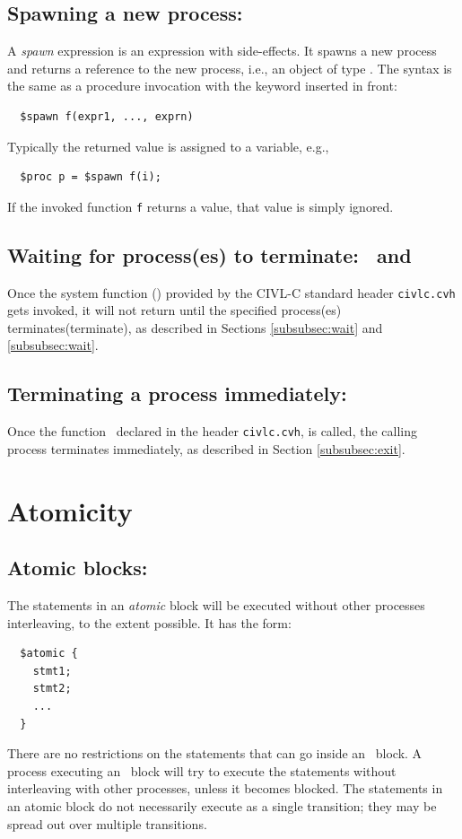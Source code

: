 \subsection{Spawning a new process: \cspawn}

A \emph{spawn} expression is an expression with side-effects.  It
spawns a new process and returns a reference to the new process, i.e.,
an object of type \cproc.  The syntax is the same as a procedure
invocation with the keyword \cspawn{} inserted in front:
\begin{verbatim}
  $spawn f(expr1, ..., exprn)
\end{verbatim}
Typically the returned value is assigned to a variable, e.g.,
\begin{verbatim}
  $proc p = $spawn f(i);
\end{verbatim}
If the invoked function \texttt{f} returns a value, that value is
simply ignored.

\subsection{Waiting for process(es) to terminate: \cwait\ and \cwaitall}

Once the system function \cwait(\cwaitall) provided by the CIVL-C standard header \texttt{civlc.cvh} 
gets invoked, it will not return until the specified process(es) terminates(terminate), as described in Sections \ref{subsubsec:wait} and
\ref{subsubsec:wait}.

\subsection{Terminating a process immediately: \cexit}
Once the function \cexit\, declared in the header \texttt{civlc.cvh}, is called, the calling process terminates immediately, as described in Section \ref{subsubsec:exit}.

\section{Atomicity}

\subsection{Atomic blocks: \catomic}

The statements in an \emph{atomic} block will be executed without
other processes interleaving, to the extent possible.  It has the
form:
\begin{verbatim}
  $atomic {
    stmt1;
    stmt2;
    ...
  }
\end{verbatim}
There are no restrictions on the statements that can go inside an 
\catomic\ block.  A process executing an \catomic~block will try to 
execute the statements without interleaving with other processes, 
unless it becomes blocked.  The statements in an atomic block do not 
necessarily execute as a single transition; they may be spread out 
over multiple transitions.

